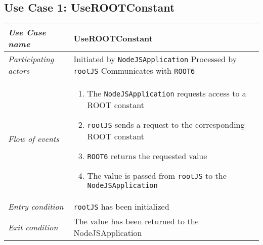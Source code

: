 \subsection{Use Case 1: UseROOTConstant}
\begin{longtable}{p{3cm} @{\hskip 1cm} p{12cm}}
	\hline
	\textit{Use Case name} & UseROOTConstant\\
	\hline
	\textit{Participating actors} & Initiated by \texttt{NodeJSApplication}
                Processed by \texttt{rootJS}
                Communicates with \texttt{ROOT6}\\
	\hline
	\textit{Flow of events} &
		\begin{enumerate}
			\item The \texttt{NodeJSApplication} requests access to a ROOT constant
			\item \texttt{rootJS} sends a request to the corresponding ROOT constant
			\item \texttt{ROOT6} returns the requested value
                        \item The value is passed from \texttt{rootJS} to the \texttt{NodeJSApplication}
		\end{enumerate}
		\\
	\hline
	\textit{Entry condition} & \texttt{rootJS} has been initialized\\
	\hline
	\textit{Exit condition} & The value has been returned to the NodeJSApplication\\
        \hline
\end{longtable}
